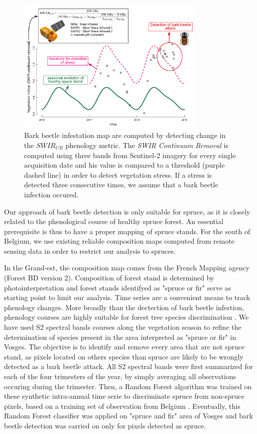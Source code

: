 \documentclass[3p,procedia]{elsarticle}
\begin{document}
\begin{figure}
	\centering
	\includegraphics[width=0.8\textwidth]{fctHarmo.png}
	\caption{Bark beetle infestation map are computed by detecting change in the $SWIR_{CR}$ phenology metric. The \textit{SWIR Continuum Removal} is computed using three bands from Sentinel-2 imagery for every single acquisition date and his value is compared to a threshold (purple dashed line) in order to detect vegetation stress. If a stress is detected three consecutive times, we assume that a bark beetle infection occured.}
	\label{fig:harmo}
\end{figure}

Our approach of bark beetle detection is only suitable for spruce, as it is closely related to the phenological course of healthy spruce forest.
An essential prerequisite is thus to have a proper mapping of spruce stands.
For the south of Belgium, we use existing reliable composition maps \citep{bolyn_forest_2018} computed from remote sensing data in order to restrict our analysis to spruces.

In the Grand-est, the composition map comes from the French Mapping agency (Forest BD version 2). 
Composition of forest stand is determined by photointerpretation and forest stands identifyed as "spruce or fir" serve as starting point to limit our analysis.
Time series are a convenient means to track phenology changes. 
More broadly than the dectection of bark beetle infestion, phenology courses are highly suitable for forest tree species discrimination \citep{lisein_discrimination_2015,grabska_forest_2019,ma_tree_2021}.
We have used S2 spectral bands courses along the vegetation season to refine the determination of species present in the area interpreted as "spruce or fir" in Vosges.
The objective is to identify and remove every area that are not spruce stand, as pixels located on others species than spruce are likely to be wrongly detected as a bark beetle attack.
All S2 spectral bands were first summarized for each of the four trimesters of the year, by simply averaging all observations occuring during the trimester.
Then, a Random Forest algorithm was trained on these synthetic intra-annual time serie to discriminate spruce from non-spruce pixels, based on a training set of observation from Belgium \citep{bolyn_forest_2018}.
Eventually, this Random Forest classifier was applied on "spruce and fir" area of Vosges and bark beetle detection was carried on only for pixels detected as spruce. 
\end{document}
